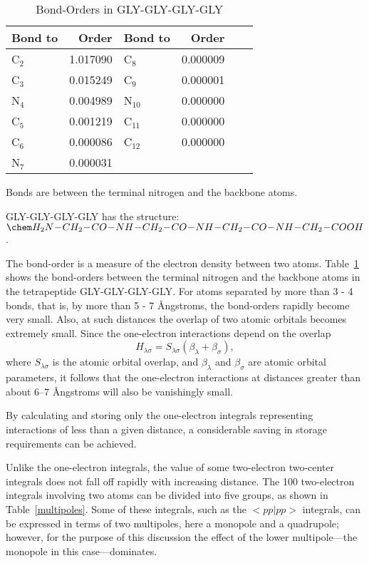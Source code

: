 \begin{table}
\caption{\label{bo}Bond-Orders in GLY-GLY-GLY-GLY}
\begin{center}
\begin{tabular}{lrlrrr}
\hline
Bond to  &  Order & Bond to & Order\\
\hline
C$_2$& 1.017090  &C$_8$ & 0.000009   \\
C$_3$& 0.015249  &C$_9$ & 0.000001 \\
N$_4$& 0.004989  &N$_{10}$ & 0.000000  \\
C$_5$& 0.001219  &C$_{11}$ & 0.000000  \\
C$_6$& 0.000086  &C$_{12}$ & 0.000000 \\
N$_7$& 0.000031  \\
\hline
\end{tabular}

Bonds are between the terminal nitrogen and the backbone atoms.

GLY-GLY-GLY-GLY has the structure:
$\chem H_2N\!-\!CH_2\!-\!CO\!-\!NH\!-\!CH_2\!-\!CO\!-\!NH\!-\!CH_2\!-\!CO\!-\!NH\!-\!CH_2\!-\!COOH  $.
\end{center}
\end{table}

The bond-order is a measure of the electron density between two atoms.  
Table~\ref{bo} shows the bond-orders between the terminal nitrogen and the
backbone atoms in the tetrapeptide GLY-GLY-GLY-GLY. \label{cutofs}  For atoms
separated by more than 3 - 4 bonds, that is, by more than  5 - 7 \AA ngstroms,
the bond-orders rapidly become very small.  Also, at such distances the overlap
of two atomic orbitals becomes extremely   small.  Since  the one-electron
interactions depend on the overlap 
\begin{equation}
H_{\lambda\sigma} = S_{\lambda\sigma}(\beta_{\lambda}+\beta_{\sigma}),
\end{equation}
where $S_{\lambda\sigma}$ is the atomic orbital overlap, and $\beta_{\lambda}$
and $\beta_{\sigma}$ are atomic orbital parameters, it follows that the
one-electron interactions at distances greater than about 6--7 \AA ngstroms will
also be vanishingly small.

By calculating and storing only the one-electron integrals representing
interactions of less than a given distance, a considerable saving in storage
requirements can be achieved.

Unlike the one-electron integrals, the value of some two-electron two-center 
integrals does not fall off rapidly with increasing distance.  The 100
two-electron  integrals involving two atoms can be divided into five groups, as
shown in Table~\ref{multipoles}.  Some of these integrals, such as the
$<\!pp|pp\!>$ integrals, can be expressed in terms of two multipoles, here a
monopole and a quadrupole; however, for the purpose of this discussion the
effect of the lower multipole---the monopole in this case---dominates.  

